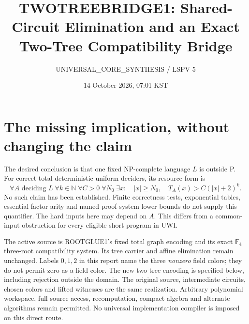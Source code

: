 \documentclass[11pt]{article}
\title{TWOTREEBRIDGE1: Shared-Circuit Elimination and an Exact Two-Tree Compatibility Bridge}
\author{UNIVERSAL\_CORE\_SYNTHESIS / LSPV-5}
\date{14 October 2026, 07:01 KST}
\begin{document}
\maketitle
\begin{center}
\end{center}

\section{The missing implication, without changing the claim}
The desired conclusion is that one fixed NP-complete language $L$ is outside
P. For correct total deterministic uniform deciders, its resource form is
\[
 \forall A\text{ deciding }L\;\forall k\in\mathbb N\;\forall C>0\;
 \forall N_0\;\exists x:\quad |x|\ge N_0,\quad
 T_A(x)>C(|x|+2)^k.
\]
No such claim has been established. Finite correctness tests, exponential
tables, essential factor arity and named proof-system lower bounds do not
supply this quantifier. The hard inputs here may depend on $A$. This differs
from a common-input obstruction for every eligible short program in UWI.

The active source is ROOTGLUE1's fixed total graph encoding and its exact
$\mathbb F_4$ three-root compatibility system. Its tree carrier and affine
elimination remain unchanged. Labels $0,1,2$ in this report name the three
\emph{nonzero} field colors; they do not permit zero as a field color.
The new two-tree encoding is specified below, including rejection outside the
domain. The original source, intermediate circuits, chosen colors and lifted
witnesses are the same realization. Arbitrary polynomial workspace, full
source access, recomputation, compact algebra and alternate algorithms remain
permitted. No universal implementation compiler is imposed on this direct route.
\end{document}
